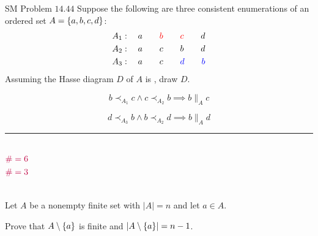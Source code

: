 \begin{frame}{}
\end{frame}

\begin{frame}{}
  \begin{exampleblock}{SM Problem $14.44$}
    Suppose the following are three consistent enumerations of an ordered set $A = \{a, b, c, d\}$:
    \begin{align*}
      A_1: \quad a \qquad \textcolor{red}{b} \qquad \textcolor{red}{c} \qquad d \\
      A_2: \quad a \qquad c \qquad b \qquad d \\
      A_3: \quad a \qquad c \qquad \textcolor{blue}{d} \qquad \textcolor{blue}{b}
    \end{align*}
    Assuming the Hasse diagram $D$ of $A$ is , draw $D$.
  \end{exampleblock}

  \pause
  \[
    b \prec_{A_1} c \land c \prec_{A_2} b \implies b \parallel_{A} c
  \]

  \[
    d \prec_{A_3} b \land b \prec_{A_2} d \implies b \parallel_{A} d
  \]
\end{frame}

\begin{frame}{}

  \hrule
  \begin{columns}[t]
    \pause
      \pause
      \[
	\textcolor{purple}{\# = 6}
      \]
    \pause
      \pause
      \[
	\textcolor{purple}{\# = 3}
      \]
  \end{columns}
\end{frame}

\begin{frame}{}
  

  \begin{theorem}

  \end{theorem}
\end{frame}

\begin{frame}{}
  \begin{exampleblock}{}
    Let $A$ be a nonempty finite set with $|A| = n$ and let $a \in A$.

    Prove that $A \setminus \{a\}$ is finite and $|A \setminus \{a\}| = n - 1$.
  \end{exampleblock}
\end{frame}

